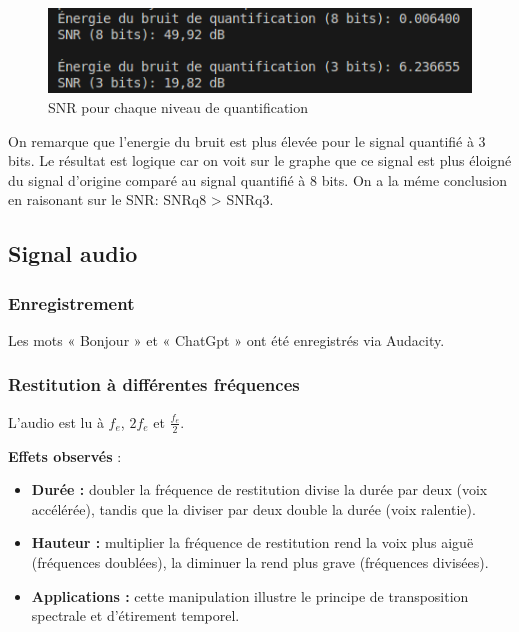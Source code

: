 \begin{figure}[!h]
\centering
\includegraphics{screenshots/snr_quantification.png}
\caption{SNR pour chaque niveau de quantification}
\end{figure}

On remarque que l'energie du bruit est plus élevée pour le signal quantifié à 3 bits. Le résultat est logique
car on voit sur le graphe que ce signal est plus éloigné du signal d'origine comparé au signal quantifié à 8 bits.
On a la méme conclusion en raisonant sur le SNR: SNRq8 > SNRq3.

\subsection{Signal audio}

\subsubsection{Enregistrement}

Les mots « Bonjour » et « ChatGpt » ont été enregistrés via Audacity. 

\subsubsection{Restitution à différentes fréquences}

L’audio est lu à \( f_e \), \( 2 f_e \) et \( \frac{f_e}{2} \). 

\textbf{Effets observés} :

\begin{itemize}
    \item \textbf{Durée :} doubler la fréquence de restitution divise la durée par deux (voix accélérée), tandis que la diviser par deux double la durée (voix ralentie).
    \item \textbf{Hauteur :} multiplier la fréquence de restitution rend la voix plus aiguë (fréquences doublées), la diminuer la rend plus grave (fréquences divisées).
    \item \textbf{Applications :} cette manipulation illustre le principe de transposition spectrale et d’étirement temporel.
\end{itemize}

